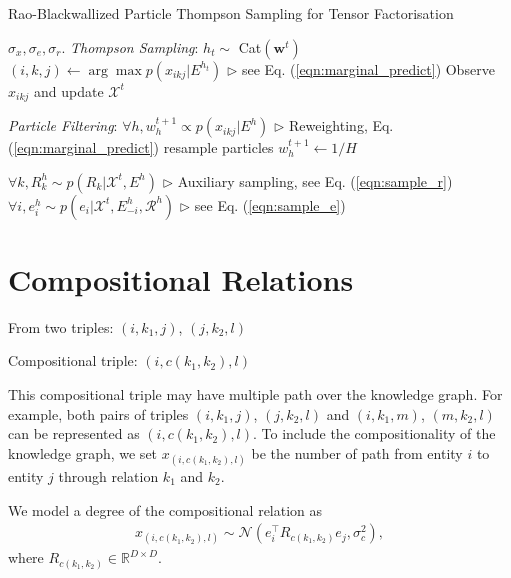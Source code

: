 \documentclass{article}
\begin{document}
\begin{algorithm}[t!]
   \caption{Rao-Blackwallized Particle Thompson Sampling for Tensor Factorisation}
   \label{alg:rbsmc}
\begin{algorithmic}
    $\sigma_x, \sigma_e, \sigma_r$.
   \STATE \textit{Thompson Sampling}:
   \STATE $h_t \sim $ Cat$(\mathbf{w}^{t})$
   \STATE $(i,k,j) \leftarrow \arg\max p(x_{ikj}| E^{h_t})$    \hfill $\triangleright$ see Eq. (\ref{eqn:marginal_predict})
   \STATE Observe $x_{ikj}$ and update $\mathcal{X}^{t}$

   \STATE \textit{Particle Filtering}:
   \STATE $\forall h, w_h^{t+1} \propto p(x_{ikj} | E^{h})$   \hfill $\triangleright$ Reweighting, Eq. (\ref{eqn:marginal_predict})
   \STATE resample particles
   \STATE $w_h^{t+1} \leftarrow 1/H$
   \ENDIF

   \STATE $\forall k, R_k^{h} \sim p(R_k | \mathcal{X}^{t}, E^{h})$   \hfill $\triangleright$ Auxiliary sampling, see Eq. (\ref{eqn:sample_r})
   \STATE $\forall i, e^{h}_i \sim p(e_i | \mathcal{X}^{t}, E^{h}_{-i}, \mathcal{R}^{h})$ \hfill $\triangleright$ see Eq. (\ref{eqn:sample_e})
   \ENDFOR

   \ENDFOR
\end{algorithmic}
\end{algorithm}

\section{Compositional Relations}

From two triples:
$(i, k_1 ,j)$,  $(j, k_2, l)$

Compositional triple:
$(i, {c}(k_1, k_2), l)$

This compositional triple may have multiple path over the knowledge graph. For example, both pairs of triples $(i, k_1 ,j)$,  $(j, k_2, l)$ and $(i, k_1 ,m)$,  $(m, k_2, l)$ can be represented as $(i, {c}(k_1, k_2), l)$. To include the compositionality of the knowledge graph, we set  $x_{(i, {{c}(k_1, k_2)}, l)}$ be the number of path from entity $i$ to entity $j$ through relation $k_1$ and $k_2$.

We model a degree of the compositional relation as
\begin{align}
x_{(i, {{c}(k_1, k_2)}, l)} \sim \mathcal{N}(e_i^\top R_{{c}(k_1,k_2)} e_j, \sigma_{c}^2),
\end{align}
where $R_{{c}(k_1,k_2)} \in \mathbb{R}^{D\times D}$.
\end{document}
